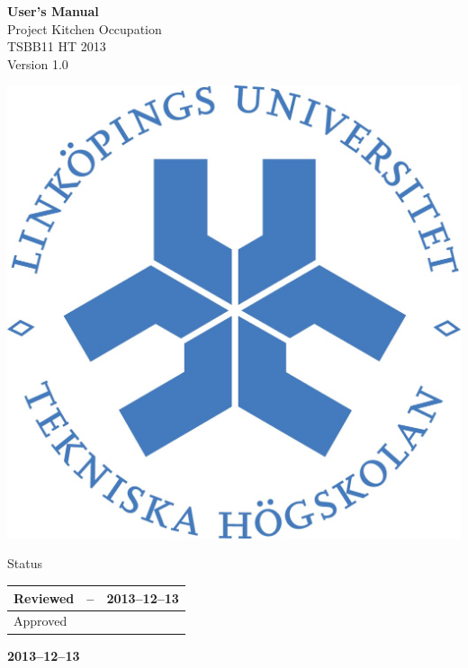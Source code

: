 \documentclass[pdftex, fontsize=11pt, a4paper]{scrbook}
\begin{document}
\begin{titlepage}
\thispagestyle{empty}
\begin{center}
	\vspace*{4\baselineskip}

	\textbf{\huge User's Manual} \\
	\vspace*{0.5\baselineskip}
	{\large  Project Kitchen Occupation} \\
	\vspace*{0.5\baselineskip}
	{\large  TSBB11 HT 2013} \\
	\vspace*{0.5\baselineskip}
	{\large  Version 1.0}


	\vspace*{6\baselineskip}
	\includegraphics[width=0.4\linewidth]{lith_sigill_col}


	\normalfont
	\small
	\vfill


	{\large  Status} \\
	\vspace*{1\baselineskip}
	\begin{tabular}{|p{4cm}|p{4cm}|p{4cm}|}
		\hline
		Reviewed & -- & 2013--12--13 \\
		\hline
		Approved &   &    \\
		\hline
	\end{tabular}


	\vspace*{2\baselineskip}

	\textbf{2013--12--13} \\
	[2\baselineskip]
\end{center}

\end{titlepage}
\end{document}
